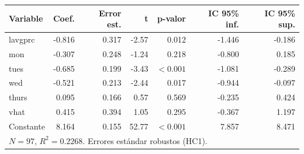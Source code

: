 
\begin{tabular}{lrrrrrr}
\toprule
Variable & Coef. & Error est. & t & p-valor & IC 95\% inf. & IC 95\% sup.\\
\midrule
lavgprc & -0.816 & 0.317 & -2.57 & 0.012 & -1.446 & -0.186\\
mon & -0.307 & 0.248 & -1.24 & 0.218 & -0.800 & 0.185\\
tues & -0.685 & 0.199 & -3.43 & $<0.001$ & -1.081 & -0.289\\
wed & -0.521 & 0.213 & -2.44 & 0.017 & -0.944 & -0.097\\
thurs & 0.095 & 0.166 & 0.57 & 0.569 & -0.235 & 0.424\\
vhat & 0.415 & 0.394 & 1.05 & 0.295 & -0.367 & 1.197\\
Constante & 8.164 & 0.155 & 52.77 & $<0.001$ & 7.857 & 8.471\\
\midrule
\multicolumn{7}{l}{$N=97$, $R^2=0.2268$. Errores estándar robustos (HC1).}\\
\bottomrule
\end{tabular}
